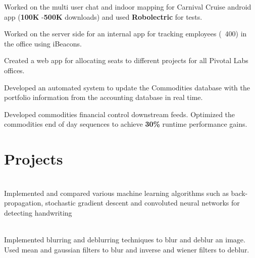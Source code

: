 \documentclass[]{deedy-resume-openfont}
\begin{document}
\begin{minipage}[t]{0.66\textwidth}
\begin{tightemize}
\item Worked on the multi user chat and indoor mapping for Carnival Cruise android app (\textcolor{boldcolor}{\textbf{100K}} -\textcolor{boldcolor}{\textbf{500K}} downloads) and used \textcolor{boldcolor}{\textbf{Robolectric}} for tests.
\item Worked on the server side for an internal app for tracking employees (~400) in the office using iBeacons.
\item Created a web app for allocating seats to different projects for all Pivotal Labs offices.
\end{tightemize}
\sectionsep


\begin{tightemize}
	\item Developed an automated system to update the Commodities database with the portfolio information from the accounting database in real time.
	\item Developed commodities financial control downstream feeds. Optimized the commodities end of day sequences to achieve \textcolor{boldcolor}{\textbf{30\%}} runtime performance gains.
\end{tightemize}
\sectionsep


\section{Projects}
 \\
Implemented and compared various machine learning algorithms such as back-propagation, stochastic gradient descent and convoluted neural networks for detecting handwriting
\sectionsep

 \\
Implemented blurring and deblurring techniques to blur and deblur an image. Used mean and gaussian filters to blur and inverse and wiener filters to deblur.\\
\sectionsep


\end{minipage} 
\end{document}
